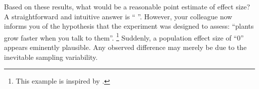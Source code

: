 \documentclass[a4paper]{article}
\newcommand{\getValue}[3]{%
	\pgfplotstablegetelem{#1}{#2}\of{#3}%
	\pgfmathprintnumber{\pgfplotsretval}%
}
\begin{document}
Based on these results, what would be a reasonable point estimate of effect size? A straightforward and intuitive answer is ``\getValue{0}{Estimate}{\tbEffectSizeExample}''. However, your colleague now informs you of the hypothesis that the experiment was designed to assess: ``plants grow faster when you talk to them''.%
\footnote{%
This example is inspired by \protect\textcite{BergerDelampady1987}.
} Suddenly, a population effect size of ``0'' appears eminently plausible. Any observed difference may merely be due to the inevitable sampling variability.%
\end{document}
